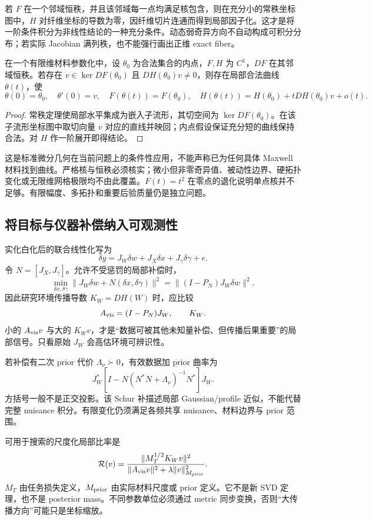 若 $F$ 在一个邻域恒秩，并且该邻域每一点均满足核包含，则在充分小的常秩坐标图中，$H$ 对纤维坐标的导数为零，因纤维切片连通而得到局部因子化。这才是将一阶条件积分为非线性结论的一种充分条件。动态弱奇异方向不自动构成可积分分布；若实际 Jacobian 满列秩，也不能强行画出正维 exact fiber。

\begin{proposition}[危险一阶方向的条件性非线性延拓]
在一个有限维材料参数化中，设 $\theta_0$ 为合法集合的内点，$F,H$ 为 $C^1$，$DF$ 在其邻域恒秩。若存在 $v\in\ker DF(\theta_0)$ 且 $DH(\theta_0)v\ne0$，则存在局部合法曲线 $\theta(t)$，使
\[
\theta(0)=\theta_0,\quad\theta'(0)=v,\quad
F(\theta(t))=F(\theta_0),\quad
H(\theta(t))=H(\theta_0)+tDH(\theta_0)v+o(t).
\]
\end{proposition}
\begin{proof}
常秩定理使局部水平集成为嵌入子流形，其切空间为 $\ker DF(\theta_0)$。在该子流形坐标图中取切向量 $v$ 对应的直线并映回；内点假设保证充分短的曲线保持合法。对 $H$ 作一阶展开即得结论。
\end{proof}
这是标准微分几何在当前问题上的条件性应用，不能声称已为任何具体 Maxwell 材料找到曲线。严格核与恒秩必须核实；微小但非零奇异值、被动性边界、硬拓扑变化或无限维网格极限均不由此覆盖。$F(t)=t^2$ 在零点的退化说明单点核并不足够。有限幅度、多拓扑和重要后验质量仍是独立问题。

\subsection{将目标与仪器补偿纳入可观测性}
实化白化后的联合线性化写为
\[
\delta y=J_W\delta w+J_X\delta x+J_\gamma\delta\gamma+e.
\]
令 $N=[J_X,J_\gamma]$。允许不受惩罚的局部补偿时，
\[
\min_{\delta x,\delta\gamma}
\|J_W\delta w+N(\delta x,\delta\gamma)\|^2
=\|(I-P_N)J_W\delta w\|^2.
\]
因此研究环境传播导数 $K_W=DH(W)$ 时，应比较
\[
A_{\rm vis}=(I-P_N)J_W,\qquad K_W.
\]
小的 $A_{\rm vis}v$ 与大的 $K_Wv$，才是“数据可被其他未知量补偿、但传播后果重要”的局部信号。只看原始 $J_W$ 会高估环境可辨识性。

若补偿有二次 prior 代价 $\Lambda_\nu\succ0$，有效数据加 prior 曲率为
\[
J_W^*\!\left[I-N(N^*N+\Lambda_\nu)^{-1}N^*\right]J_W.
\]
方括号一般不是正交投影。该 Schur 补描述局部 Gaussian/profile 近似，不能代替完整 nuisance 积分。有限变化仍须满足各频共享 nuisance、材料边界与 prior 范围。

可用于搜索的尺度化局部比率是
\[
\mathcal R(v)=
\frac{\|M_T^{1/2}K_Wv\|^2}
{\|A_{\rm vis}v\|^2+\lambda\|v\|_{M_{\rm prior}}^2}.
\]
$M_T$ 由任务损失定义，$M_{\rm prior}$ 由实际材料尺度或 prior 定义。它不是新 SVD 定理，也不是 posterior mass。不同参数单位必须通过 metric 同步变换，否则“大传播方向”可能只是坐标缩放。

